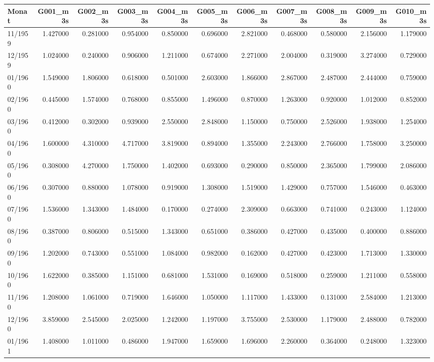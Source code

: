 \begin{tabular}{lrrrrrrrrrr}
\toprule
Monat & G001_m3s & G002_m3s & G003_m3s & G004_m3s & G005_m3s & G006_m3s & G007_m3s & G008_m3s & G009_m3s & G010_m3s \\
\midrule
11/1959 & 1.427000 & 0.281000 & 0.954000 & 0.850000 & 0.696000 & 2.821000 & 0.468000 & 0.580000 & 2.156000 & 1.179000 \\
12/1959 & 1.024000 & 0.240000 & 0.906000 & 1.211000 & 0.674000 & 2.271000 & 2.004000 & 0.319000 & 3.274000 & 0.729000 \\
01/1960 & 1.549000 & 1.806000 & 0.618000 & 0.501000 & 2.603000 & 1.866000 & 2.867000 & 2.487000 & 2.444000 & 0.759000 \\
02/1960 & 0.445000 & 1.574000 & 0.768000 & 0.855000 & 1.496000 & 0.870000 & 1.263000 & 0.920000 & 1.012000 & 0.852000 \\
03/1960 & 0.412000 & 0.302000 & 0.939000 & 2.550000 & 2.848000 & 1.150000 & 0.750000 & 2.526000 & 1.938000 & 1.254000 \\
04/1960 & 1.600000 & 4.310000 & 4.717000 & 3.819000 & 0.894000 & 1.355000 & 2.243000 & 2.766000 & 1.758000 & 3.250000 \\
05/1960 & 0.308000 & 4.270000 & 1.750000 & 1.402000 & 0.693000 & 0.290000 & 0.850000 & 2.365000 & 1.799000 & 2.086000 \\
06/1960 & 0.307000 & 0.880000 & 1.078000 & 0.919000 & 1.308000 & 1.519000 & 1.429000 & 0.757000 & 1.546000 & 0.463000 \\
07/1960 & 1.536000 & 1.343000 & 1.484000 & 0.170000 & 0.274000 & 2.309000 & 0.663000 & 0.741000 & 0.243000 & 1.124000 \\
08/1960 & 0.387000 & 0.806000 & 0.515000 & 1.343000 & 0.651000 & 0.386000 & 0.427000 & 0.435000 & 0.400000 & 0.886000 \\
09/1960 & 1.202000 & 0.743000 & 0.551000 & 1.084000 & 0.982000 & 0.162000 & 0.427000 & 0.423000 & 1.713000 & 1.330000 \\
10/1960 & 1.622000 & 0.385000 & 1.151000 & 0.681000 & 1.531000 & 0.169000 & 0.518000 & 0.259000 & 1.211000 & 0.558000 \\
11/1960 & 1.208000 & 1.061000 & 0.719000 & 1.646000 & 1.050000 & 1.117000 & 1.433000 & 0.131000 & 2.584000 & 1.213000 \\
12/1960 & 3.859000 & 2.545000 & 2.025000 & 1.242000 & 1.197000 & 3.755000 & 2.530000 & 1.179000 & 2.488000 & 0.782000 \\
01/1961 & 1.408000 & 1.011000 & 0.486000 & 1.947000 & 1.659000 & 1.696000 & 2.260000 & 0.364000 & 0.248000 & 1.323000 \\

\end{tabular}
